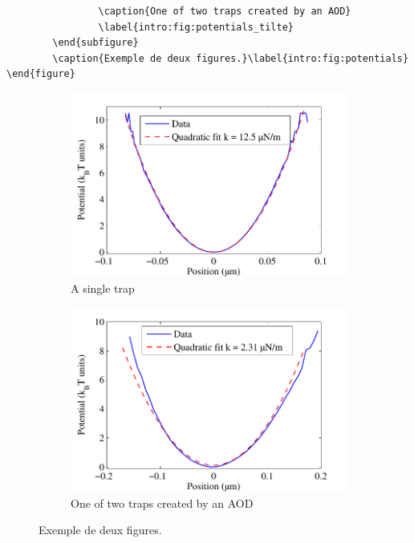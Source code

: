 {\begin{verbatim}
                \caption{One of two traps created by an AOD}
                \label{intro:fig:potentials_tilte}
        \end{subfigure}
        \caption{Exemple de deux figures.}\label{intro:fig:potentials}
\end{figure}
\end{verbatim}}

\begin{figure}[ht!]
        \centering
        \begin{subfigure}[c]{0.5\textwidth}
                \includegraphics[width=\textwidth]{Chapitre1/Figures/exemple_potentiel_quadratic.pdf}
                \caption{A single trap}
                \label{intro:fig:potentials_OK}
        \end{subfigure}%
        \begin{subfigure}[c]{0.5\textwidth}
                \includegraphics[width=\textwidth]{Chapitre1/Figures/exemple_potentiel_quadratic_tilte.pdf}
                \caption{One of two traps created by an AOD}
                \label{intro:fig:potentials_tilte}
        \end{subfigure}
        \caption{Exemple de deux figures.}\label{intro:fig:potentials}
\end{figure}


